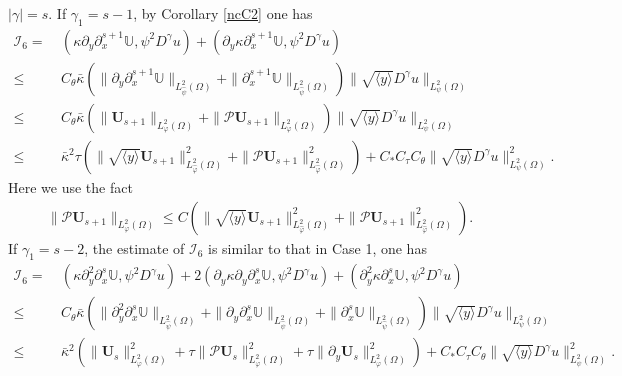 \documentclass{amsart}
\numberwithin{equation}{section}
\newcommand\y{{{\langle y \rangle}}}
\begin{document}
 $|\gamma|=s$. If $\gamma_{1}=s-1$, by Corollary \ref{ncC2} one has
\begin{align}\label{I6c21}
\mathcal{I}_{6}
=&~(\kappa\partial_{y}\partial_{x}^{s+1}\mathbb{U},\psi^{2}D^{\gamma}u)
  +(\partial_{y}\kappa\partial_{x}^{s+1}\mathbb{U},\psi^{2}D^{\gamma}u)\\
\leq&~C_{\theta}\bar{\kappa}\left(\|\partial_{y}\partial_{x}^{s+1}\mathbb{U}\|_{L_{\hat{\psi}}^{2}(\Omega)}
                                  +\|\partial_{x}^{s+1}\mathbb{U}\|_{L_{\hat{\psi}}^{2}(\Omega)}\right)
                            \|\sqrt{\y}D^{\gamma}u\|_{L_{\psi}^{2}(\Omega)}\nonumber\\
\leq&~C_{\theta}\bar{\kappa}
      \left(\|\mathbf{U}_{s+1}\|_{L_{\varphi}^{2}(\Omega)}+\|\mathcal{P}\mathbf{U}_{s+1}\|_{L_{\varphi}^{2}(\Omega)}\right)
      \|\sqrt{\y}D^{\gamma}u\|_{L_{\psi}^{2}(\Omega)}\nonumber\\
\leq&~\bar{\kappa}^{2}\tau\left(\|\sqrt{\y}\mathbf{U}_{s+1}\|_{L_{\hat{\varphi}}^{2}(\Omega)}^{2}
                            +\|\mathcal{P}\mathbf{U}_{s+1}\|_{L_{\hat{\varphi}}^{2}(\Omega)}^{2}\right)
     +C_{*}C_{\tau}C_{\theta}\|\sqrt{\y}D^{\gamma}u\|_{L_{\psi}^{2}(\Omega)}^{2}.\nonumber
\end{align}
Here we use the fact
\begin{align*}
\|\mathcal{P}\mathbf{U}_{s+1}\|_{L_{\varphi}^{2}(\Omega)}
\leq C\left(\|\sqrt{\y}\mathbf{U}_{s+1}\|_{L_{\hat{\varphi}}^{2}(\Omega)}^{2}+\|\mathcal{P}\mathbf{U}_{s+1}\|_{L_{\hat{\varphi}}^{2}(\Omega)}^{2}\right).
\end{align*}
If $\gamma_{1}=s-2$, the estimate of $\mathcal{I}_{6}$ is similar to that in Case 1, one has
\begin{align}\label{I6c22}
\mathcal{I}_{6}
=&~(\kappa\partial_{y}^{2}\partial_{x}^{s}\mathbb{U},\psi^{2}D^{\gamma}u)
  +2(\partial_{y}\kappa\partial_{y}\partial_{x}^{s}\mathbb{U},\psi^{2}D^{\gamma}u)
  +(\partial_{y}^{2}\kappa\partial_{x}^{s}\mathbb{U},\psi^{2}D^{\gamma}u)\\
\leq&~C_{\theta}\bar{\kappa}\left(\|\partial_{y}^{2}\partial_{x}^{s}\mathbb{U}\|_{L_{\hat{\psi}}^{2}(\Omega)}
                        +\|\partial_{y}\partial_{x}^{s}\mathbb{U}\|_{L_{\hat{\psi}}^{2}(\Omega)}
                        +\|\partial_{x}^{s}\mathbb{U}\|_{L_{\hat{\psi}}^{2}(\Omega)}\right)
                  \|\sqrt{\y}D^{\gamma}u\|_{L_{\psi}^{2}(\Omega)}\nonumber\\
\leq&~\bar{\kappa}^{2}\left(\|\mathbf{U}_{s}\|_{L_{\varphi}^{2}(\Omega)}^{2}
                +\tau\|\mathcal{P}\mathbf{U}_{s}\|_{L_{\varphi}^{2}(\Omega)}^{2}
                +\tau\|\partial_{y}\mathbf{U}_{s}\|_{L_{\varphi}^{2}(\Omega)}^{2}\right)
     +C_{*}C_{\tau}C_{\theta}\|\sqrt{\y}D^{\gamma}u\|_{L_{\psi}^{2}(\Omega)}^{2}.\nonumber
\end{align}
\end{document}
